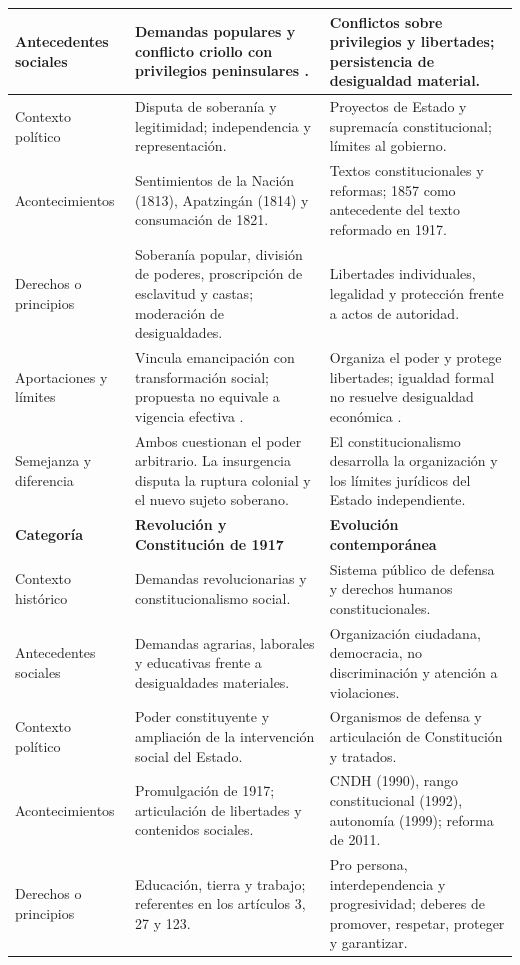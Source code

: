 \documentclass[12pt,spanish,letterpaper,oneside]{article}
\newcommand{\encabezado}[2]{\rowcolor{cabecera}\textbf{Categor\'ia}&\textbf{#1}&\textbf{#2}\\\hline}
\newlength{\categorywidth}
\newlength{\periodwidth}
\newlength{\lastperiodwidth}
\begin{document}
\begin{landscape}
\begin{longtable}{|>{\raggedright\arraybackslash}p{\categorywidth}|>{\raggedright\arraybackslash}p{\periodwidth}|>{\raggedright\arraybackslash}p{\lastperiodwidth}|}
Antecedentes sociales & Demandas populares y conflicto criollo con privilegios peninsulares \citep[p.~73]{delgado2010}. & Conflictos sobre privilegios y libertades; persistencia de desigualdad material. \\\hline
Contexto pol\'itico & Disputa de soberan\'ia y legitimidad; independencia y representaci\'on. & Proyectos de Estado y supremac\'ia constitucional; l\'imites al gobierno. \\\hline
Acontecimientos & Sentimientos de la Naci\'on (1813), Apatzing\'an (1814) y consumaci\'on de 1821. & Textos constitucionales y reformas; 1857 como antecedente del texto reformado en 1917. \\\hline
Derechos o principios & Soberan\'ia popular, divisi\'on de poderes, proscripci\'on de esclavitud y castas; moderaci\'on de desigualdades. & Libertades individuales, legalidad y protecci\'on frente a actos de autoridad. \\\hline
Aportaciones y l\'imites & Vincula emancipaci\'on con transformaci\'on social; propuesta no equivale a vigencia efectiva \citep[nums.~5, 12 y 15]{morelos1813}. & Organiza el poder y protege libertades; igualdad formal no resuelve desigualdad econ\'omica \citep[pp.~1--2, 7]{arteaga}. \\\hline
Semejanza y diferencia & Ambos cuestionan el poder arbitrario. La insurgencia disputa la ruptura colonial y el nuevo sujeto soberano. & El constitucionalismo desarrolla la organizaci\'on y los l\'imites jur\'idicos del Estado independiente. \\\hline
\encabezado{Revoluci\'on y Constituci\'on de 1917}{Evoluci\'on contempor\'anea}
Contexto hist\'orico & Demandas revolucionarias y constitucionalismo social. & Sistema p\'ublico de defensa y derechos humanos constitucionales. \\\hline
Antecedentes sociales & Demandas agrarias, laborales y educativas frente a desigualdades materiales. & Organizaci\'on ciudadana, democracia, no discriminaci\'on y atenci\'on a violaciones. \\\hline
Contexto pol\'itico & Poder constituyente y ampliaci\'on de la intervenci\'on social del Estado. & Organismos de defensa y articulaci\'on de Constituci\'on y tratados. \\\hline
Acontecimientos & Promulgaci\'on de 1917; articulaci\'on de libertades y contenidos sociales. & CNDH (1990), rango constitucional (1992), autonom\'ia (1999); reforma de 2011. \\\hline
Derechos o principios & Educaci\'on, tierra y trabajo; referentes en los art\'iculos 3, 27 y 123. & Pro persona, interdependencia y progresividad; deberes de promover, respetar, proteger y garantizar. \\\hline

\end{longtable}
\end{landscape}
\end{document}
